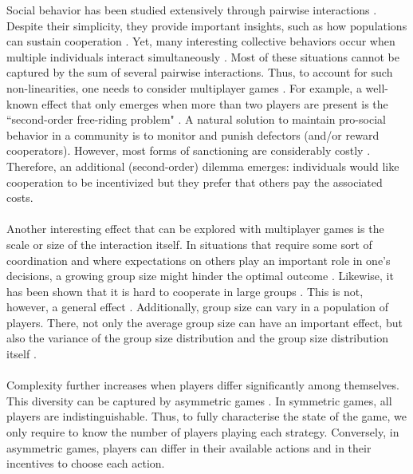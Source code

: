 \documentclass[11pt]{article}
\theoremstyle{plainCl1}
\theoremstyle{plainCl2}
\begin{document}
Social behavior has been studied extensively through pairwise interactions \cite{Hofbauer:book:1998}. Despite their simplicity, they provide important insights, such as how populations can sustain cooperation \cite{Axelrod:book:1984, Nowak:Science:2006,  Nowak:book:2011}. 
Yet, many interesting collective behaviors occur when multiple individuals interact simultaneously \cite{Palm:JMB:1984, Skyrms:book:2003, Pacheco:PRSB:2009, Archetti:EL:2011, Archetti:JTB:2012, Gokhale:DGAA:2014, Pena:JTB:2014, Hilbe:JTB:2015, Venkateswaran:PRSB:2019}.
Most of these situations cannot be captured by the sum of several pairwise interactions. Thus, to account for such non-linearities, one needs to consider multiplayer games \cite{Gokhale:DGAA:2014}. For example, a well-known effect that only emerges when more than two players are present is the ``second-order free-riding problem" \cite{Fowler:PNAS:2005}. A natural solution to maintain pro-social behavior in a community is to monitor and punish defectors (and/or reward cooperators). However, most forms of sanctioning are considerably costly \cite{Henrich:Science:2006}. Therefore, an additional (second-order) dilemma emerges: individuals would like cooperation to be incentivized but they prefer that others pay the associated costs.
\\ \\
\noindent 
Another interesting effect that can be explored with multiplayer games is the scale or size of the interaction itself. In situations that require some sort of coordination and where expectations on others play an important role in one's decisions, a growing group size might hinder the optimal outcome \cite{Skyrms:book:2003}. Likewise, it has been shown that it is hard to cooperate in large groups \cite{Santos:PNAS:2011, Hilbe:JTB:2015,Pena:jtb:2018}. This is not, however, a general effect \cite{gokhale:JTB:2011}. 
Additionally, group size can vary in a population of players. There, not only the average group size can have an important effect, but also the variance of the group size distribution \cite{Pena:Evolution:2011, Broom:BMB:2019} and the group size distribution itself \cite{Pena:JTB:2016}.
\\ \\ 
\noindent Complexity further increases when players differ significantly among themselves. This diversity can be captured by asymmetric games \cite{Taylor:JAP:1979, Schuster:AB:1981, Gaunersdorfer:TPB:1991, Hofbauer:JMB:1996, Hofbauer:GEB:2005, Ohtsuki:JTB:2010, McAvoy:PlosCB:2015, Veller:JET:2016, Hauser:Nature:2019}. In symmetric games, all players are indistinguishable. Thus, to fully characterise the state of the game, we only require to know the number of players playing each strategy. Conversely, in asymmetric games, players can differ in their available actions and in their incentives to choose each action.
\end{document}
